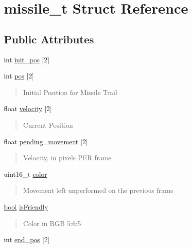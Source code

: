 \hypertarget{structmissile__t}{}\section{missile\+\_\+t Struct Reference}
\label{structmissile__t}
\subsection*{Public Attributes}
\begin{DoxyCompactItemize}
\item 
int \hyperlink{structmissile__t_ae9b8a60e3fc505cbdc6a73eecec22593}{init\+\_\+pos} \mbox{[}2\mbox{]}
\item 
int \hyperlink{structmissile__t_acad3785ef3162b36ea58106e7cac3d3c}{pos} \mbox{[}2\mbox{]}
\begin{DoxyCompactList}\small\item\em \begin{quote}
Initial Position for Missile Trail \end{quote}
\end{DoxyCompactList}\item 
float \hyperlink{structmissile__t_a33888390438f5edf647bf8ddf7ebd646}{velocity} \mbox{[}2\mbox{]}
\begin{DoxyCompactList}\small\item\em \begin{quote}
Current Position \end{quote}
\end{DoxyCompactList}\item 
float \hyperlink{structmissile__t_ad8c173c28c4adbf4b25292f0d2ea6a82}{pending\+\_\+movement} \mbox{[}2\mbox{]}
\begin{DoxyCompactList}\small\item\em \begin{quote}
Velocity, in pixels P\+ER frame \end{quote}
\end{DoxyCompactList}\item 
uint16\+\_\+t \hyperlink{structmissile__t_ac4f6693bdb22fa048147f089f57c5d59}{color}
\begin{DoxyCompactList}\small\item\em \begin{quote}
Movement left unperformed on the previous frame \end{quote}
\end{DoxyCompactList}\item 
\hyperlink{_missile_8c_af6a258d8f3ee5206d682d799316314b1}{bool} \hyperlink{structmissile__t_a4b5fd447e6a7f348d5986e74d843e8e2}{is\+Friendly}
\begin{DoxyCompactList}\small\item\em \begin{quote}
Color in R\+GB 5\+:6\+:5 \end{quote}
\end{DoxyCompactList}\item 
int \hyperlink{structmissile__t_acfc81d3ad2e8655c604ed499d038256d}{end\+\_\+pos} \mbox{[}2\mbox{]}
\end{DoxyCompactItemize}


